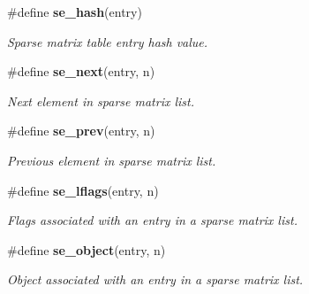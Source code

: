 \begin{CompactItemize}
\#define {\bf se\_\-hash}(entry)
\begin{CompactList}\small\item\em Sparse matrix table entry hash value.\item\end{CompactList}\item 
\#define {\bf se\_\-next}(entry, n)
\begin{CompactList}\small\item\em Next element in sparse matrix list.\item\end{CompactList}\item 
\#define {\bf se\_\-prev}(entry, n)
\begin{CompactList}\small\item\em Previous element in sparse matrix list.\item\end{CompactList}\item 
\#define {\bf se\_\-lflags}(entry, n)
\begin{CompactList}\small\item\em Flags associated with an entry in a sparse matrix list.\item\end{CompactList}\item 
\#define {\bf se\_\-object}(entry, n)
\begin{CompactList}\small\item\em Object associated with an entry in a sparse matrix list.\item\end{CompactList}\end{CompactItemize}
